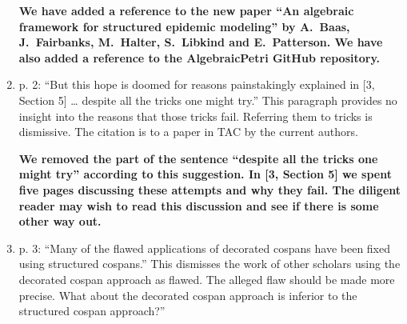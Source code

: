 \documentclass[reqno]{amsart}
\def\chris{\color{purple} Christina: }
\def\john{\color{red} John: }
\def\kenny{\color{blue} Kenny: }
\begin{document}
\begin{enumerate}
{\bf We have added a reference to the new paper ``An
algebraic framework for structured epidemic modeling'' by A.\ Baas, J.\ Fairbanks, M.\ Halter, S.\ Libkind and E.\ Patterson.  We have also added a reference to the AlgebraicPetri GitHub repository.}

  

\iffalse
{\john It'd be good to add a reference to the repository.}

{\chris I added the reference but looks a bit funny, edit at will. Did not add any text.}

{\john I've improved the reference and added a citation to it.  Is this okay now?}

{\chris Yes!}
\fi


\item p. 2: ``But this hope is doomed for reasons painstakingly explained in [3, Section 5] … despite all the tricks one might try.'' This paragraph 
provides 
no insight into the reasons that those tricks fail. Referring them to tricks is dismissive. The citation is to a paper in TAC by the current authors.

{\bf We removed the part of the sentence ``despite all the tricks one might try'' according to this suggestion. In [3, Section 5] we spent five pages discussing these attempts and why they fail.    The diligent reader may wish to read this discussion and see if there is some other way out.}

  

\iffalse
{\john He thought we were being dismissive because he didn't know that the ``tricks'' were all things I'd done myself!  If he looked at [1, Section 5] 
he'd see it was me coming up with a bunch of tricks to try to save the decorated cospan category of open graphs, and then Kenny and me explaining why 
this tricks don't work.  So maybe I should just delete ``despite all the tricks one might try''.  Sound good?}

{\chris Sounds good to me! See above, amend at will.}

{\kenny Sounds good.}
\fi

\item p. 3: ``Many of the flawed applications of decorated cospans have been fixed using structured cospans.” This dismisses the work of other 
scholars 
using the decorated cospan approach as flawed. The alleged flaw should be made more precise. What about the decorated cospan approach is inferior to 
the structured cospan approach?''


\end{enumerate}
\end{document}
